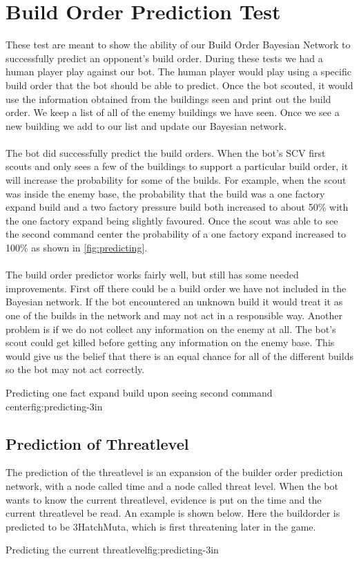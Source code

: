 \section{Build Order Prediction Test}
These test are meant to show the ability of our Build Order Bayesian Network to successfully predict an opponent's build order.
During these tests we had a human player play against our bot. The human player would play using a specific build order that the bot should be able to predict. Once the bot scouted, it would use the information obtained from the buildings seen and print out the build order. We keep a list of all of the enemy buildings we have seen. Once we see a new building we add to our list and update our Bayesian network.\\
\\
The bot did successfully predict the build orders. When the bot's SCV first scouts and only sees a few of the buildings to support a particular build order, it will increase the probability for some of the builds. For example, when the scout was inside the enemy base, the probability that the build was a one factory expand build and a two factory pressure build both increased to about 50\% with the one factory expand being slightly favoured. Once the scout was able to see the second command center the probability of a one factory expand increased to 100\% as shown in \ref{fig:predicting}. 
\\
\\
The build order predictor works fairly well, but still has some needed improvements. First off there could be a build order we have not included in the Bayesian network. If the bot encountered an unknown build it would treat it as one of the builds in the network and may not act in a responsible way. Another problem is if we do not collect any information on the enemy at all. The bot's scout could get killed before getting any information on the enemy base. This would give us the belief that there is an equal chance for all of the different builds so the bot may not act correctly.

					{Predicting one fact expand build upon seeing second command center}{fig:predicting}{-3in}
	\subsection{Prediction of Threatlevel}
		The prediction of the threatlevel is an expansion of the builder order prediction network, with a node called time and a node called threat level. 
		When the bot wants to know the current threatlevel, evidence is put on the time and the current threatlevel be read. An example is shown below. 
		Here the buildorder is predicted to be 3HatchMuta, which is first threatening later in the game. 
	
			{Predicting the current threatlevel}{fig:predicting}{-3in}